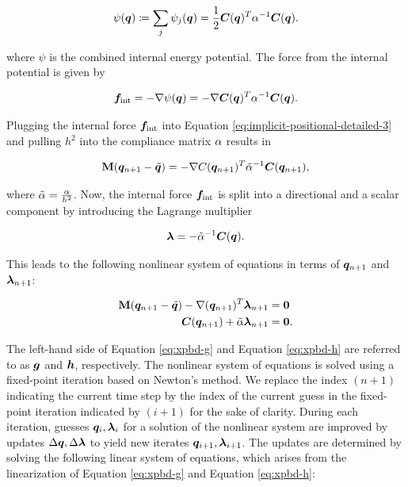 \begin{equation}\label{eq:xpbd-potential}
    \psi(\bm{q}) \coloneqq \sum_j \psi_j(\bm{q}) = \frac{1}{2}\bm{C}(\bm{q})^T \mathbf{\alpha}^{-1} \bm{C}(\bm{q}).
\end{equation}

\noindent where $\psi$ is the combined internal energy potential. The force from the internal potential is given by

\begin{equation}\label{eq:xpbd-internal-force}
    \bm{f}_{\text{int}} = -\nabla \psi(\bm{q}) = -\nabla \bm{C}(\bm{q})^T \mathbf{\alpha}^{-1} \bm{C}(\bm{q}).
\end{equation}

\noindent Plugging the internal force $\bm{f}_{\text{int}}$ into Equation \ref{eq:implicit-positional-detailed-3} and pulling $h^2$ into the 
compliance matrix $\mathbf{\alpha}$ results in

\[
    \mathbf{M}(\bm{q}_{n+1} - \tilde{\bm{q}}) = - \nabla C(\bm{q}_{n+1})^T \tilde{\mathbf{\alpha}}^{-1} \bm{C}(\bm{q}_{n+1}),
\]

\noindent where $\tilde{\mathbf{\alpha}} = \frac{\mathbf{\alpha}}{h^2}$. Now, the internal force $\bm{f}_{\text{int}}$ is split into a directional 
and a scalar component by introducing the Lagrange multiplier

\begin{equation}\label{eq:lagrange-multiplier}
    \bm{\lambda} = -\tilde{\mathbf{\alpha}}^{-1}\bm{C}(\bm{q}).
\end{equation}

\noindent This leads to the following nonlinear system of equations in terms of $\bm{q}_{n+1}$ and $\bm{\lambda}_{n+1}$:

\begin{align}
    \mathbf{M}(\bm{q}_{n+1} - \tilde{\bm{q}}) - \nabla (\bm{q}_{n+1})^T \bm{\lambda}_{n+1} &= \bm{0} \label{eq:xpbd-g} \\
    \bm{C}(\bm{q}_{n+1}) + \tilde{\mathbf{\alpha}}\bm{\lambda}_{n+1} &= \bm{0} \label{eq:xpbd-h}.
\end{align}

\noindent The left-hand side of Equation \ref{eq:xpbd-g} and Equation \ref{eq:xpbd-h} are referred to as $\bm{g}$ and $\bm{h}$, respectively. The nonlinear 
system of equations is solved using a fixed-point iteration based on Newton's method. We replace the index $(n+1)$ indicating the current
time step by the index of the current guess in the fixed-point iteration indicated by $(i+1)$ for the sake of clarity. During each iteration, 
guesses $\bm{q}_i, \bm{\lambda}_i$ for a solution of the nonlinear system are improved by updates $\Delta \bm{q}, \Delta \bm{\lambda}$ to 
yield new iterates $\bm{q}_{i+1}, \bm{\lambda}_{i+1}$. The updates are determined by solving the following linear system of equations, 
which arises from the linearization of Equation \ref{eq:xpbd-g} and Equation \ref{eq:xpbd-h}:


